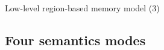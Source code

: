 \begin{frame}{Low-level region-based memory model (3)}
\end{frame}



\subsection{Four semantics modes}


